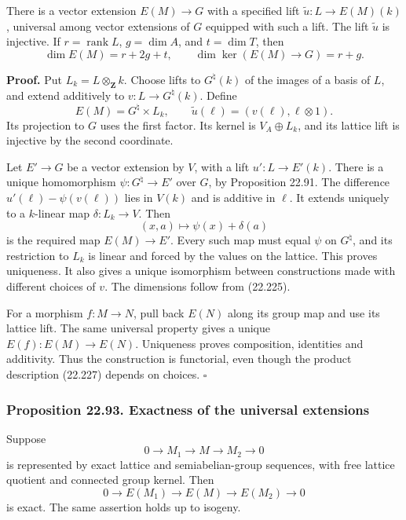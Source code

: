 \documentclass[
  11pt,
  a4paper,
]{article}
\begin{document}
There is a vector extension \(E(M)\to G\) with a specified lift
\(\widetilde u:L\to E(M)(k)\), universal among vector extensions of
\(G\) equipped with such a lift. The lift \(\widetilde u\) is injective.
If \(r=\operatorname{rank}L\), \(g=\dim A\), and \(t=\dim T\), then \[
 \dim E(M)=r+2g+t,\qquad
 \dim\ker(E(M)\to G)=r+g.
 \tag{22.226}
\]

\textbf{Proof.} Put \(L_k=L\otimes_{\mathbf Z}k\). Choose lifts to
\(G^\natural(k)\) of the images of a basis of \(L\), and extend
additively to \(v:L\to G^\natural(k)\). Define \[
 E(M)=G^\natural\times L_k,\qquad
 \widetilde u(\ell)=(v(\ell),\ell\otimes1).
 \tag{22.227}
\] Its projection to \(G\) uses the first factor. Its kernel is
\(V_A\oplus L_k\), and its lattice lift is injective by the second
coordinate.

Let \(E'\to G\) be a vector extension by \(V\), with a lift
\(u':L\to E'(k)\). There is a unique homomorphism
\(\psi:G^\natural\to E'\) over \(G\), by Proposition 22.91. The
difference \(u'(\ell)-\psi(v(\ell))\) lies in \(V(k)\) and is additive
in \(\ell\). It extends uniquely to a \(k\)-linear map
\(\delta:L_k\to V\). Then \[
 (x,a)\longmapsto\psi(x)+\delta(a)
 \tag{22.228}
\] is the required map \(E(M)\to E'\). Every such map must equal
\(\psi\) on \(G^\natural\), and its restriction to \(L_k\) is linear and
forced by the values on the lattice. This proves uniqueness. It also
gives a unique isomorphism between constructions made with different
choices of \(v\). The dimensions follow from (22.225).

For a morphism \(f:M\to N\), pull back \(E(N)\) along its group map and
use its lattice lift. The same universal property gives a unique
\(E(f):E(M)\to E(N)\). Uniqueness proves composition, identities and
additivity. Thus the construction is functorial, even though the product
description (22.227) depends on choices. \(\square\)

\subsubsection{Proposition 22.93. Exactness of the universal
extensions}\label{proposition-22.93.-exactness-of-the-universal-extensions}

Suppose \[
 0\longrightarrow M_1\longrightarrow M
 \longrightarrow M_2\longrightarrow0
 \tag{22.229}
\] is represented by exact lattice and semiabelian-group sequences, with
free lattice quotient and connected group kernel. Then \[
 0\longrightarrow E(M_1)\longrightarrow E(M)
 \longrightarrow E(M_2)\longrightarrow0
 \tag{22.230}
\] is exact. The same assertion holds up to isogeny.
\end{document}
